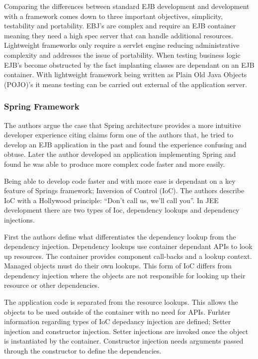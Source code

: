 														Comparing the differences between standard EJB development and development with a framework comes down to three important objectives, simplicity, testability and portability. EBJ’s are complex and require an EJB container meaning they need a high spec server that can handle additional resources. Lightweight frameworks only require a servlet engine reducing administrative complexity and addresses the issue of portability. When testing business logic EJB’s become obstructed by the fact implanting classes are dependant on an EJB container. With lightweight framework being written as Plain Old Java Objects (POJO)’s it means testing can be carried out external of the application server.
														
														\subsubsection{Spring Framework}
														The authors argue the case that Spring architecture provides a more intuitive developer experience citing claims form one of the authors that, he tried to develop an EJB application in the past and found the experience confusing and obtuse. Later the author developed an application implementing Spring and found he was able to produce more complex code faster and more easily.
														
														Being able to develop code faster and with more ease is dependant on a key feature of Springs framework; Inversion of Control (IoC). The authors describe IoC with a Hollywood principle: “Don’t call us, we’ll call you”. In JEE development there are two types of Ioc, dependency lookups and dependency injections.
														
														First the authors define what differentiates the dependency lookup from the dependency injection. Dependency lookups use container dependant APIs to look up resources. The container provides component call-backs and a lookup context. Managed objects must do their own lookups. This form of IoC differs from dependency injection where the objects are not responsible for looking up their resource or other dependencies.
														
														The application code is separated from the resource lookups. This allows the objects to be used outside of the container with no need for APIs. Furhter information regarding types of IoC depedancy injection are defined; Setter injection and constructor injection. Setter injections are invoked once the object is instantiated by the container. Constructor injection needs arguments passed through the constructor to define the dependencies.
														
